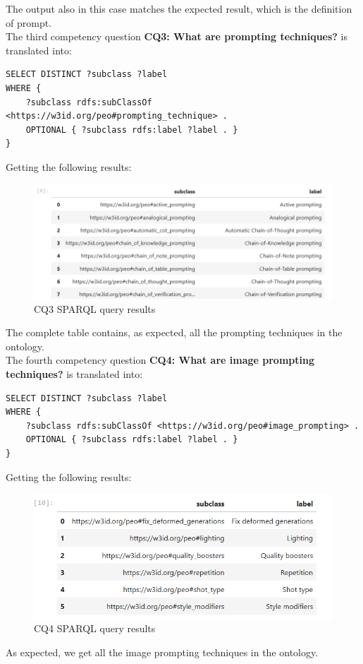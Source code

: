 The output also in this case matches the expected result, which is the definition of prompt.\\

The third competency question \textbf{CQ3: What are prompting techniques?} is translated into:
\begin{lstlisting}
SELECT DISTINCT ?subclass ?label
WHERE {
    ?subclass rdfs:subClassOf <https://w3id.org/peo#prompting_technique> .
    OPTIONAL { ?subclass rdfs:label ?label . }
}
\end{lstlisting}
Getting the following results:
\begin{figure}[H]
    \centering
    \includegraphics[width=0.9\linewidth]{Figures/fig_49.png}
    \caption{CQ3 SPARQL query results}
    \label{fig:enter-label}
\end{figure}
The complete table contains, as expected, all the prompting techniques in the ontology.\\

The fourth competency question \textbf{CQ4: What are image prompting techniques?} is translated into:
\begin{lstlisting}
SELECT DISTINCT ?subclass ?label
WHERE {
    ?subclass rdfs:subClassOf <https://w3id.org/peo#image_prompting> .
    OPTIONAL { ?subclass rdfs:label ?label . }
}
\end{lstlisting}
Getting the following results:
\begin{figure}[H]
    \centering
    \includegraphics[width=0.9\linewidth]{Figures/fig_50.png}
    \caption{CQ4 SPARQL query results}
    \label{fig:enter-label}
\end{figure}
As expected, we get all the image prompting techniques in the ontology.\\

